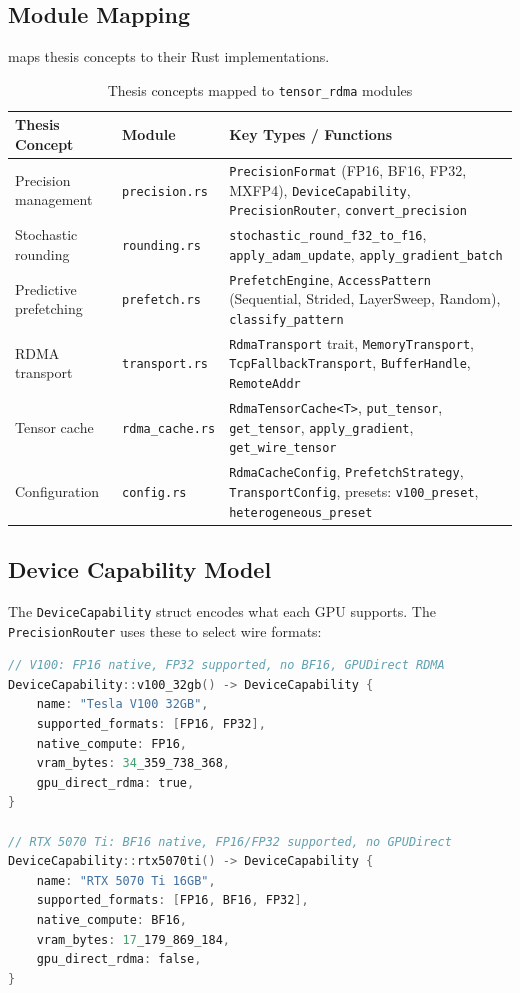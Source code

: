 \documentclass[11pt,letterpaper]{article}
\theoremstyle{definition}
\begin{document}
\subsection{Module Mapping}

 maps thesis concepts to their Rust implementations.

\begin{table}[htbp]
\centering
\caption{Thesis concepts mapped to \texttt{tensor\_rdma} modules}
\label{tab:module-mapping}
\begin{tabular}{@{}llp{6cm}@{}}
\toprule
\textbf{Thesis Concept} & \textbf{Module} & \textbf{Key Types / Functions} \\
\midrule
Precision management & \texttt{precision.rs} & \texttt{PrecisionFormat} (FP16, BF16, FP32, MXFP4), \texttt{DeviceCapability}, \texttt{PrecisionRouter}, \texttt{convert\_precision} \\
Stochastic rounding & \texttt{rounding.rs} & \texttt{stochastic\_round\_f32\_to\_f16}, \texttt{apply\_adam\_update}, \texttt{apply\_gradient\_batch} \\
Predictive prefetching & \texttt{prefetch.rs} & \texttt{PrefetchEngine}, \texttt{AccessPattern} (Sequential, Strided, LayerSweep, Random), \texttt{classify\_pattern} \\
RDMA transport & \texttt{transport.rs} & \texttt{RdmaTransport} trait, \texttt{MemoryTransport}, \texttt{TcpFallbackTransport}, \texttt{BufferHandle}, \texttt{RemoteAddr} \\
Tensor cache & \texttt{rdma\_cache.rs} & \texttt{RdmaTensorCache<T>}, \texttt{put\_tensor}, \texttt{get\_tensor}, \texttt{apply\_gradient}, \texttt{get\_wire\_tensor} \\
Configuration & \texttt{config.rs} & \texttt{RdmaCacheConfig}, \texttt{PrefetchStrategy}, \texttt{TransportConfig}, presets: \texttt{v100\_preset}, \texttt{heterogeneous\_preset} \\
\bottomrule
\end{tabular}
\end{table}

\subsection{Device Capability Model}

The \texttt{DeviceCapability} struct encodes what each GPU supports. The \texttt{PrecisionRouter} uses these to select wire formats:

\begin{lstlisting}[language=C, caption={Device capabilities for our hardware}, label={lst:device-caps}]
// V100: FP16 native, FP32 supported, no BF16, GPUDirect RDMA
DeviceCapability::v100_32gb() -> DeviceCapability {
    name: "Tesla V100 32GB",
    supported_formats: [FP16, FP32],
    native_compute: FP16,
    vram_bytes: 34_359_738_368,
    gpu_direct_rdma: true,
}

// RTX 5070 Ti: BF16 native, FP16/FP32 supported, no GPUDirect
DeviceCapability::rtx5070ti() -> DeviceCapability {
    name: "RTX 5070 Ti 16GB",
    supported_formats: [FP16, BF16, FP32],
    native_compute: BF16,
    vram_bytes: 17_179_869_184,
    gpu_direct_rdma: false,
}
\end{lstlisting}
\end{document}
